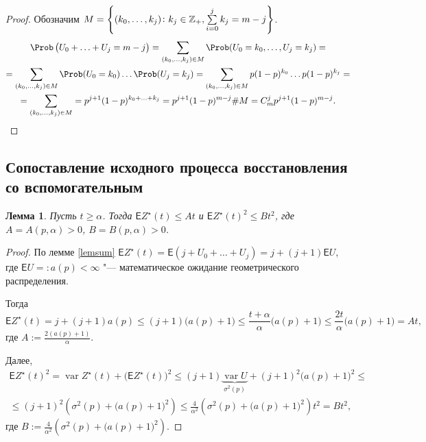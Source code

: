 \documentclass[a4paper]{article}
\newcommand{\Expect}{\mathsf{E}}
\newcommand{\nonneg}{\ensuremath\mathbb Z_+}
\DeclareMathOperator{\var}{\mathrm var}
\theoremstyle{plain}
\newtheorem{lem}[thm]{Лемма}
\theoremstyle{definition}
\theoremstyle{remark}
\theoremstyle{nonumberplain}
\newtheorem{proof}{Доказательство}
\theoremstyle{nonumberplain}
\begin{document}
\begin{proof}
   Обозначим $M = \left\{ (k_0, \ldots, k_j)\colon k_j \in \nonneg, \sum\limits_{i = 0}^j k_j = m - j\right\}$.
  \begin{multline*}
    \Prob\left( U_0 + \ldots + U_j = m - j\right) = \sum_{(k_0, \ldots, k_j) \in M} \Prob(U_0 = k_0, \ldots, U_j = k_j) =\\
    = \sum_{(k_0, \ldots, k_j) \in M} \Prob(U_0 = k_0)\ldots \Prob(U_j = k_j) = \sum_{(k_0, \ldots, k_j) \in M} p (1 - p)^{k_0}\ldots p (1 - p)^{k_j} =\\
    = \sum_{(k_0, \ldots, k_j) \in M} = p^{j + 1} (1 - p)^{k_0 + \ldots + k_j}
    = p^{j + 1} (1 - p)^{m - j} \#M = C_m^j p^{j + 1} (1 - p)^{m - j}.
  \end{multline*}
\end{proof}

\subsection{Сопоставление исходного процесса восстановления со вспомогательным}

\begin{lem}\label{est}
  Пусть $t \geqslant \alpha$. Тогда $\Expect Z^\star(t) \leqslant At$ и $\Expect Z^\star(t)^2 \leqslant B t^2$, где $A = A(p, \alpha) > 0$, $B = B(p, \alpha) > 0$.
\end{lem}

\begin{proof}
  По лемме \ref{lemsum} $\Expect Z^\star(t) = \Expect(j + U_0 + \ldots + U_j) = j + (j + 1) \Expect U$, где $\Expect U =: a(p) < \infty$ "--- математическое ожидание геометрического распределения.

  Тогда
  \begin{equation*}
    \Expect Z^\star(t) = j + (j + 1) a(p) \leqslant (j + 1) \big(a(p) + 1\big)
    \leqslant \frac{t + \alpha}{\alpha} \big(a(p) + 1\big) \leqslant \frac{2 t}{\alpha} \big( a(p) + 1 \big) = A t,
  \end{equation*}
  где $A := \frac{2 (a(p) + 1)}{\alpha}$.

  Далее,
  \begin{multline*}
    \Expect Z^\star(t)^2 = \var Z^\star(t) + \big(\Expect Z^\star(t) \big)^2 \leqslant (j + 1) \underbrace{\var U}_{\sigma^2(p)} + (j + 1)^2 \big( a(p) + 1 \big)^2 \leqslant\\
    \leqslant (j + 1)^2 \left( \sigma^2(p) + \big( a(p) + 1 \big)^2 \right) \leqslant \frac{4}{\alpha^2} \left( \sigma^2(p) + \big( a(p) + 1 \big)^2 \right) t^2 = B t^2,
  \end{multline*}
  где $B := \frac{4}{\alpha^2} \left( \sigma^2(p) + \big( a(p) + 1 \big)^2 \right)$.
\end{proof}
\end{document}
